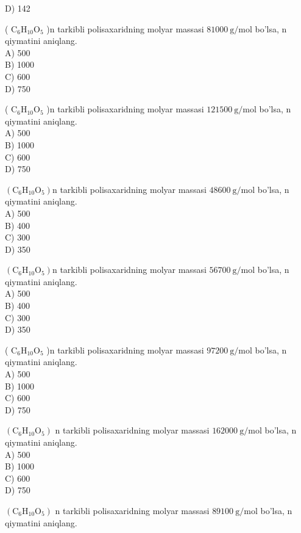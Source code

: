 D) 142
  \item ( $\mathrm{C}_{6} \mathrm{H}_{10} \mathrm{O}_{5}$ )n tarkibli polisaxaridning molyar massasi $81000 \mathrm{~g} / \mathrm{mol}$ bo'lsa, n qiymatini aniqlang.\\
A) 500\\
B) 1000\\
C) 600\\
D) 750\\
  \item ( $\mathrm{C}_{6} \mathrm{H}_{10} \mathrm{O}_{5}$ )n tarkibli polisaxaridning molyar massasi $121500 \mathrm{~g} / \mathrm{mol}$ bo'lsa, n qiymatini aniqlang.\\
A) 500\\
B) 1000\\
C) 600\\
D) 750
  \item $\left(\mathrm{C}_{6} \mathrm{H}_{10} \mathrm{O}_{5}\right) \mathrm{n}$ tarkibli polisaxaridning molyar massasi $48600 \mathrm{~g} / \mathrm{mol}$ bo'lsa, n qiymatini aniqlang.\\
A) 500\\
B) 400\\
C) 300\\
D) 350
  \item $\left(\mathrm{C}_{6} \mathrm{H}_{10} \mathrm{O}_{5}\right) \mathrm{n}$ tarkibli polisaxaridning molyar massasi $56700 \mathrm{~g} / \mathrm{mol}$ bo'lsa, n qiymatini aniqlang.\\
A) 500\\
B) 400\\
C) 300\\
D) 350
  \item ( $\mathrm{C}_{6} \mathrm{H}_{10} \mathrm{O}_{5}$ )n tarkibli polisaxaridning molyar massasi $97200 \mathrm{~g} / \mathrm{mol}$ bo'lsa, n qiymatini aniqlang.\\
A) 500\\
B) 1000\\
C) 600\\
D) 750
  \item $\left(\mathrm{C}_{6} \mathrm{H}_{10} \mathrm{O}_{5}\right)$ n tarkibli polisaxaridning molyar massasi $162000 \mathrm{~g} / \mathrm{mol}$ bo'lsa, n qiymatini aniqlang.\\
A) 500\\
B) 1000\\
C) 600\\
D) 750
  \item $\left(\mathrm{C}_{6} \mathrm{H}_{10} \mathrm{O}_{5}\right)$ n tarkibli polisaxaridning molyar massasi $89100 \mathrm{~g} / \mathrm{mol}$ bo'lsa, n qiymatini aniqlang.\\

